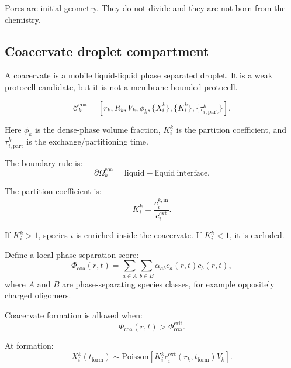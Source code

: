 \documentclass[11pt]{article}
\begin{document}
Pores are initial geometry. They do not divide and they are not born from the
chemistry.

\subsection{Coacervate droplet compartment}

A coacervate is a mobile liquid-liquid phase separated droplet. It is a weak
protocell candidate, but it is not a membrane-bounded protocell.

\begin{equation}
    \mathcal{C}_k^{\mathrm{coa}}
    =
    \left[
    r_k,
    R_k,
    V_k,
    \phi_k,
    \{X_i^k\},
    \{K_i^k\},
    \{\tau_{i,\mathrm{part}}^k\}
    \right].
\end{equation}

Here $\phi_k$ is the dense-phase volume fraction, $K_i^k$ is the partition
coefficient, and $\tau_{i,\mathrm{part}}^k$ is the exchange/partitioning time.

The boundary rule is:
\begin{equation}
    \partial\Omega_k^{\mathrm{coa}}
    =
    \mathrm{liquid-liquid\ interface}.
\end{equation}

The partition coefficient is:
\begin{equation}
    K_i^k =
    \frac{c_i^{k,\mathrm{in}}}{c_i^{\mathrm{ext}}}.
\end{equation}

If $K_i^k>1$, species $i$ is enriched inside the coacervate. If $K_i^k<1$,
it is excluded.

Define a local phase-separation score:
\begin{equation}
    \Phi_{\mathrm{coa}}(r,t)
    =
    \sum_{a\in A}
    \sum_{b\in B}
    \alpha_{ab}c_a(r,t)c_b(r,t),
\end{equation}
where $A$ and $B$ are phase-separating species classes, for example oppositely
charged oligomers.

Coacervate formation is allowed when:
\begin{equation}
    \Phi_{\mathrm{coa}}(r,t) >
    \Phi_{\mathrm{coa}}^{\mathrm{crit}}.
\end{equation}

At formation:
\begin{equation}
    X_i^k(t_{\mathrm{form}})
    \sim
    \mathrm{Poisson}
    \left[
    K_i^k c_i^{\mathrm{ext}}(r_k,t_{\mathrm{form}})V_k
    \right].
\end{equation}
\end{document}
